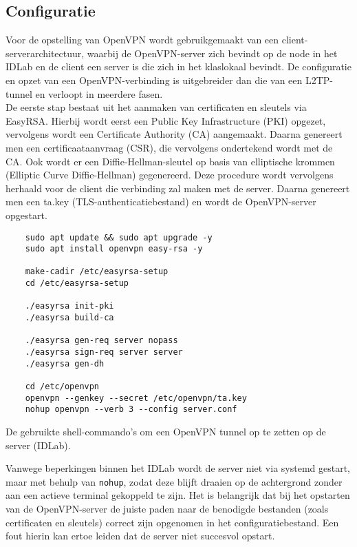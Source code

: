 \subsection{Configuratie}

Voor de opstelling van OpenVPN wordt gebruikgemaakt van een client-serverarchitectuur, waarbij de OpenVPN-server zich bevindt op de node in het IDLab en de client een server is die zich in het klaslokaal bevindt.
De configuratie en opzet van een OpenVPN-verbinding is uitgebreider dan die van een L2TP-tunnel en verloopt in meerdere fasen.
\\

De eerste stap bestaat uit het aanmaken van certificaten en sleutels via EasyRSA. Hierbij wordt eerst een Public Key Infrastructure (PKI) opgezet, vervolgens wordt een Certificate Authority (CA) aangemaakt. 
Daarna genereert men een certificaataanvraag (CSR), die vervolgens ondertekend wordt met de CA. 
Ook wordt er een Diffie-Hellman-sleutel op basis van elliptische krommen (Elliptic Curve Diffie-Hellman) gegenereerd.
Deze procedure wordt vervolgens herhaald voor de client die verbinding zal maken met de server.
Daarna genereert men een ta.key (TLS-authenticatiebestand) en wordt de OpenVPN-server opgestart.

\begin{listing}[H]
\begin{verbatim}
    sudo apt update && sudo apt upgrade -y
    sudo apt install openvpn easy-rsa -y

    make-cadir /etc/easyrsa-setup
    cd /etc/easyrsa-setup

    ./easyrsa init-pki
    ./easyrsa build-ca

    ./easyrsa gen-req server nopass
    ./easyrsa sign-req server server
    ./easyrsa gen-dh

    cd /etc/openvpn
    openvpn --genkey --secret /etc/openvpn/ta.key
    nohup openvpn --verb 3 --config server.conf
\end{verbatim}
\caption[Configuratie OpenVPN Server]{De gebruikte shell-commando's om een OpenVPN tunnel op te zetten op de server (IDLab).}
\end{listing}

Vanwege beperkingen binnen het IDLab wordt de server niet via systemd gestart, maar met behulp van \texttt{nohup}, zodat deze blijft draaien op de achtergrond zonder aan een actieve terminal gekoppeld te zijn.
Het is belangrijk dat bij het opstarten van de OpenVPN-server de juiste paden naar de benodigde bestanden (zoals certificaten en sleutels) correct zijn opgenomen in het configuratiebestand. 
Een fout hierin kan ertoe leiden dat de server niet succesvol opstart.

